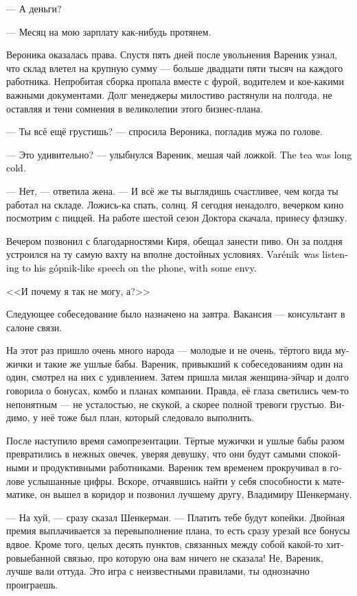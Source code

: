 \documentclass[a5paper,12pt,fleqn]{extbook}\usepackage{cooltooltips}\usepackage{polyglossia}\setdefaultlanguage[babelshorthands=true]{russian}\setotherlanguage{english}\defaultfontfeatures{Ligatures=TeX,Mapping=tex-text} \usepackage{xcolor}\definecolor{lightgray}{HTML}{bbbbbb}\color{lightgray}\newcommand{\ml}[3]{\textenglish{\textcolor{black}{#3}}}
\newcommand{\asterism}{\vspace{1em}{\centering\Large\bfseries$\ast~\ast~\ast$\par}\vspace{1em}}
\newcommand{\Varenik}{Var\'enik}
\newcommand{\gopnik}{g\'opnik}
\begin{document}
--- А деньги?

--- Месяц на мою зарплату как-нибудь протянем.

Вероника оказалась права.
Спустя пять дней после увольнения Вареник узнал, что склад влетел на крупную сумму --- больше двадцати пяти тысяч на каждого работника.
Непробитая сборка пропала вместе с фурой, водителем и кое-какими важными документами.
Долг менеджеры милостиво растянули на полгода, не оставляя и тени сомнения в великолепии этого бизнес-плана.

--- Ты всё ещё грустишь? --- спросила Вероника, погладив мужа по голове.

--- Это удивительно? --- улыбнулся Вареник, мешая чай ложкой.
\ml{$0$}
{Чай уже давно остыл.}
{The tea was long cold.}

--- Нет, --- ответила жена.
--- И всё же ты выглядишь счастливее, чем когда ты работал на складе.
Ложись-ка спать, солнц.
Я сегодня ненадолго, вечерком кино посмотрим с пиццей.
На работе шестой сезон Доктора скачала, принесу флэшку.

Вечером позвонил с благодарностями Киря, обещал занести пиво.
Он за полдня устроился на ту самую вахту на вполне достойных условиях.
\ml{$0$}
{Вареник слушал его гоповатую речь в трубке с некоторой завистью.}
{\Varenik\ was listening to his \gopnik-like speech on the phone, with some envy.}

<<И почему я так не могу, а?>>

\asterism

Следующее собеседование было назначено на завтра.
Вакансия --- консультант в салоне связи.

На этот раз пришло очень много народа --- молодые и не очень, тёртого вида мужички и такие же ушлые бабы.
Вареник, привыкший к собеседованиям один на один, смотрел на них с удивлением.
Затем пришла милая женщина-эйчар и долго говорила о бонусах, комбо и планах компании.
Правда, её глаза светились чем-то непонятным --- не усталостью, не скукой, а скорее полной тревоги грустью.
Видимо, у неё тоже был план, который следовало выполнить.

После наступило время самопрезентации.
Тёртые мужички и ушлые бабы разом превратились в нежных овечек, уверяя девушку, что они будут самыми спокойными и продуктивными работниками.
Вареник тем временем прокручивал в голове услышанные цифры.
Вскоре, отчаявшись найти у себя способности к математике, он вышел в коридор и позвонил лучшему другу, Владимиру Шенкерману.

--- На хуй, --- сразу сказал Шенкерман.
--- Платить тебе будут копейки.
Двойная премия выплачивается за перевыполнение плана, то есть сразу урезай все бонусы вдвое.
Кроме того, целых десять пунктов, связанных между собой какой-то хитровыебанной связью, про которую она вам ничего не сказала!
Не, Вареник, лучше вали оттуда.
Это игра с неизвестными правилами, ты однозначно проиграешь.
\end{document}
